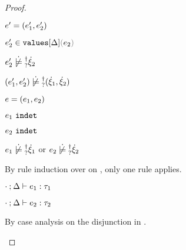 \begin{proof}
\begin{byCases}
\begin{byCases}
\begin{byCases}
\begin{byCases}
\begin{byCases}
\begin{byCases}
              \begin{pfsteps*}
              \item $e'=(e_1' , e_2')$ 
              \item $\inValues{e_2'}{\Delta}{e_2}$  
              \item $\cnotsatisfyormay{e_2'}{\hxi_2}$  
              \item $\cnotsatisfyormay{\hpair{e_1'}{e_2'}}{\cpair{\hxi_1}{\hxi_2}}$ 
              \end{pfsteps*} 
            \end{byCases}
          \end{byCases}
        \end{byCases}
        \item[\text{(\ref{rule:IPair})}] 
        \begin{pfsteps*}
        \item $e=(e_1 , e_2)$ 
        \item $e_1 ~\mathtt{indet}$  
        \item $e_2 ~\mathtt{indet}$  
        \item $\cnotsatisfyormay{e_1}{\hxi_1}$ or $\cnotsatisfyormay{e_2}{\hxi_2}$  
        \end{pfsteps*}
        By rule induction over  on , only one rule applies.
        \begin{byCases}
          \item[\text{(\ref{rule:TPair})}]
          \begin{pfsteps*}
          \item $\cdot \mathbin{;} \Delta \vdash e_1 : \tau_1$  
          \item $\cdot \mathbin{;} \Delta \vdash e_2 : \tau_2$  
          \end{pfsteps*} 
          By case analysis on the disjunction in .
          \begin{byCases}
            \item[\cnotsatisfyormay{e_1}{\hxi_1}]

\end{byCases}
\end{byCases}
\end{byCases}
\end{byCases}
\end{byCases}
\end{proof}
